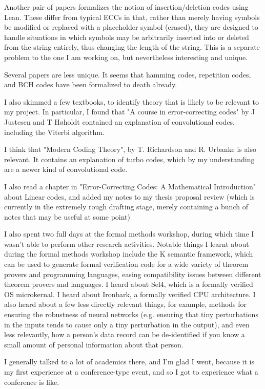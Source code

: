 \documentclass{article}
\begin{document}
Another pair of papers formalizes the notion of insertion/deletion codes using Lean. These differ from typical ECCs in that, rather than merely having symbols be modified or replaced with a placeholder symbol (erased), they are designed to handle situations in which symbols may be arbitrarily inserted into or deleted from the string entirely, thus changing the length of the string. This is a separate problem to the one I am working on, but nevertheless interesting and unique.

Several papers are less unique. It seems that hamming codes, repetition codes, and BCH codes have been formalized to death already.

I also skimmed a few textbooks, to identify theory that is likely to be relevant to my project. In particular, I found that "A course in error-correcting codes" by J Justesen and T Høholdt contained an explanation of convolutional codes, including the Viterbi algorithm.

I think that "Modern Coding Theory", by T. Richardson and R. Urbanke is also relevant. It contains an explanation of turbo codes, which by my understanding are a newer kind of convolutional code.

I also read a chapter in "Error-Correcting Codes: A Mathematical Introduction" about Linear codes, and added my notes to my thesis proposal review (which is currently in the extremely rough drafting stage, merely containing a bunch of notes that may be useful at some point)

I also spent two full days at the formal methods workshop, during which time I wasn't able to perform other research activities. Notable things I learnt about during the formal methods workshop include the K semantic framework, which can be used to generate formal verification code for a wide variety of theorem provers and programming languages, easing compatibility issues between different theorem provers and languages. I heard about Sel4, which is a formally verified OS microkernal. I heard about Ironbark, a formally verified CPU architecture. I also heard about a few less directly relevant things, for example, methods for ensuring the robustness of neural networks (e.g. ensuring that tiny perturbations in the inputs tends to cause only a tiny perturbation in the output), and even less relevantly, how a person's data record can be de-identified if you know a small amount of personal information about that person.

I generally talked to a lot of academics there, and I'm glad I went, because it is my first experience at a conference-type event, and so I got to experience what a conference is like.
\end{document}
